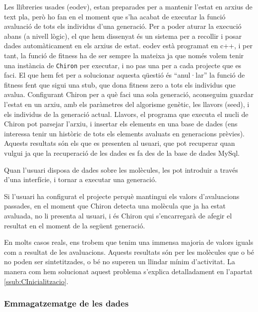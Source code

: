 Les llibreries usades (eodev), estan preparades per a mantenir l'estat en arxius
de text pla, però ho fan en el moment que s'ha acabat de executar la funció
avaluació de tots els individus d'una generació.  Per a poder aturar la
execució abans (a nivell lògic), el que hem dissenyat és un sistema per a
recollir i posar dades automàticament en els arxius de estat.  eodev està
programat en c++, i per tant, la funció de fitness ha de ser sempre la mateixa
ja que només volem tenir una instància de \texttt{Chiron} per executar, i no pas
una per a cada projecte que es faci.  El que hem fet per a solucionar aquesta
qüestió és ``anul·lar'' la funció de fitness fent que sigui una stub, que dona
fitness zero a tots els individus que avalua.  Configurant Chiron per a què
faci una sola generació, aconseguim guardar l'estat en un arxiu, amb els
paràmetres del algorisme genètic, les llavors (seed), i els individus de la
generació actual.  Llavors, el programa que executa el nucli de Chiron pot
parsejar l'arxiu, i insertar els elements en una base de dades (ens interessa
tenir un històric de tots els elements avaluats en generacions prèvies).
Aquests resultats són els que es presenten al usuari, que pot recuperar quan
vulgui ja que la recuperació de les dades es fa des de la base de dades MySql.

Quan l'usuari disposa de dades sobre les molècules, les pot introduir a través
d'una interfície, i tornar a executar una generació.

Si l'usuari ha configurat el projecte perquè mantingui els valors d'avaluacions
passades, en el moment que Chiron detecta una molècula que ja ha estat avaluada,
no li presenta al usuari, i és Chiron qui s'encarregarà de afegir el resultat en
el moment de la següent generació.


En  molts casos reals, ens trobem que tenim una immensa majoria de valors iguals
com a resultat de les avaluacions.  Aquests resultats són per les molècules que
o bé no poden ser sintetitzades, o bé no superen un llindar mínim d'activitat.
La manera com hem solucionat aquest problema s'explica detalladament en
l'apartat \ref{ssub:CInicialitzacio}.


\subsubsection{Emmagatzematge de les dades} %
\label{ssub:Emmagatzematge de les dades}

